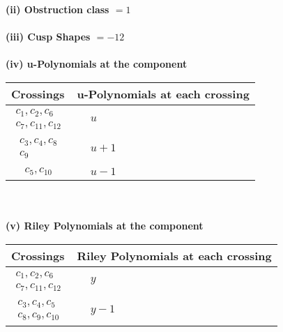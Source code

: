 \documentclass[1p]{elsarticle_modified}
\theoremstyle{definition}
\begin{document}
\flushleft \textbf{(ii) Obstruction class $= 1$}\\~\\
\flushleft \textbf{(iii) Cusp Shapes $= -12$}\\~\\
\newpage\renewcommand{\arraystretch}{1}
\flushleft \textbf{(iv) u-Polynomials at the component}\newline \\
\begin{tabular}{m{50pt}|m{274pt}}
Crossings & \hspace{64pt}u-Polynomials at each crossing \\
\hline $$\begin{aligned}c_{1},c_{2},c_{6}\\c_{7},c_{11},c_{12}\end{aligned}$$&$\begin{aligned}
&u
\end{aligned}$\\
\hline $$\begin{aligned}c_{3},c_{4},c_{8}\\c_{9}\end{aligned}$$&$\begin{aligned}
&u+1
\end{aligned}$\\
\hline $$\begin{aligned}c_{5},c_{10}\end{aligned}$$&$\begin{aligned}
&u-1
\end{aligned}$\\
\hline
\end{tabular}\\~\\
\newpage\renewcommand{\arraystretch}{1}
\flushleft \textbf{(v) Riley Polynomials at the component}\newline \\
\begin{tabular}{m{50pt}|m{274pt}}
Crossings & \hspace{64pt}Riley Polynomials at each crossing \\
\hline $$\begin{aligned}c_{1},c_{2},c_{6}\\c_{7},c_{11},c_{12}\end{aligned}$$&$\begin{aligned}
&y
\end{aligned}$\\
\hline $$\begin{aligned}c_{3},c_{4},c_{5}\\c_{8},c_{9},c_{10}\end{aligned}$$&$\begin{aligned}
&y-1
\end{aligned}$\\
\hline
\end{tabular}\\~\\
\end{document}
